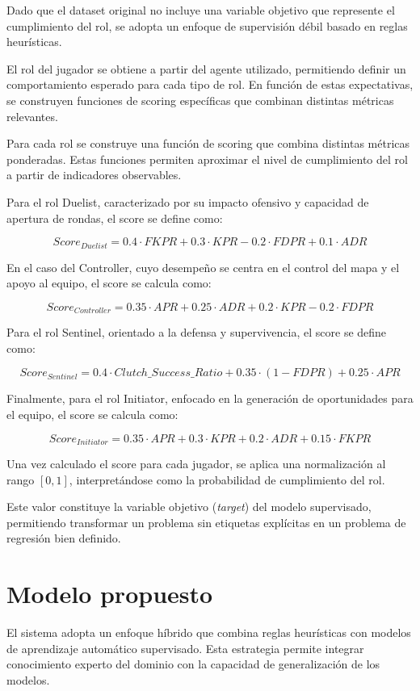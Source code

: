 \documentclass{ULBreport} %
\begin{document}
Dado que el dataset original no incluye una variable objetivo que represente el cumplimiento del rol, se adopta un enfoque de supervisión débil basado en reglas heurísticas.

El rol del jugador se obtiene a partir del agente utilizado, permitiendo definir un comportamiento esperado para cada tipo de rol. En función de estas expectativas, se construyen funciones de scoring específicas que combinan distintas métricas relevantes.

Para cada rol se construye una función de scoring que combina distintas métricas ponderadas. Estas funciones permiten aproximar el nivel de cumplimiento del rol a partir de indicadores observables.

Para el rol Duelist, caracterizado por su impacto ofensivo y capacidad de apertura de rondas, el score se define como:

\[
Score_{Duelist} = 0.4 \cdot FKPR + 0.3 \cdot KPR - 0.2 \cdot FDPR + 0.1 \cdot ADR
\]

En el caso del Controller, cuyo desempeño se centra en el control del mapa y el apoyo al equipo, el score se calcula como:

\[
Score_{Controller} = 0.35 \cdot APR + 0.25 \cdot ADR + 0.2 \cdot KPR - 0.2 \cdot FDPR
\]

Para el rol Sentinel, orientado a la defensa y supervivencia, el score se define como:

\[
Score_{Sentinel} = 0.4 \cdot Clutch\_Success\_Ratio + 0.35 \cdot (1 - FDPR) + 0.25 \cdot APR
\]

Finalmente, para el rol Initiator, enfocado en la generación de oportunidades para el equipo, el score se calcula como:

\[
Score_{Initiator} = 0.35 \cdot APR + 0.3 \cdot KPR + 0.2 \cdot ADR + 0.15 \cdot FKPR
\]

Una vez calculado el score para cada jugador, se aplica una normalización al rango $[0,1]$, interpretándose como la probabilidad de cumplimiento del rol.

Este valor constituye la variable objetivo (\textit{target}) del modelo supervisado, permitiendo transformar un problema sin etiquetas explícitas en un problema de regresión bien definido.

\section{Modelo propuesto}

El sistema adopta un enfoque híbrido que combina reglas heurísticas con modelos de aprendizaje automático supervisado. Esta estrategia permite integrar conocimiento experto del dominio con la capacidad de generalización de los modelos.
\end{document}
